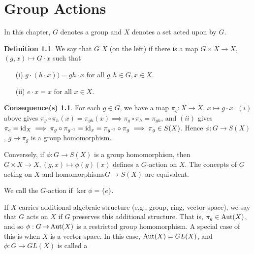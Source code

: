 \documentclass[11pt]{book}
\newcounter{counter}
\theoremstyle{definition}   \newtheorem{defn}[counter]{Definition} %
\newtheorem{consequence}[counter]{Consequence(s)}   \newtheorem*{consequence*}{Consequence(s)}   \newtheorem*{problem*}{Problem}   \newtheorem{notation}[counter]{Notation}
\newcommand{\hm}{homomorphism}   \newcommand{\hms}{homomorphisms}   \newcommand{\iso}{isomorphism}
\DeclareMathOperator{\ra}{\rightarrow}   \DeclareMathOperator{\Poly}{\mathbf{P}}   \DeclareMathOperator{\spn}{\textnormal{span}}   \DeclareMathOperator{\aut}{\textnormal{Aut}}
\newcommand{\vs}{\vspace{8pt}}
\numberwithin{counter}{chapter}
\begin{document}
\chapter{Group Actions}

In this chapter, $G$ denotes a group and $X$ denotes a set acted upon by $G$.
\vs

\begin{defn}
We say that $G$  $X$ (on the left) if there is a map $G \times X \ra X$, $(g,x) \mapsto G\cdot x$ such that
	\begin{enumerate}
	\item[(i)] $g\cdot(h\cdot x)) = gh \cdot x$ for all $g,h \in G, x \in X$.
	\item[(ii)] $e \cdot x = x$ for all $x \in X$.
	\end{enumerate}
\end{defn}

\vs

\begin{consequence}
For each $g\in G$, we have a map $\pi_g : X \ra X$, $x \mapsto g\cdot x$. $(i)$ above gives $\pi_g \circ \pi_h (x) = \pi_{gh}(x) \implies \pi_g \circ \pi_h = \pi_{gh}$, and $(ii)$ gives $\pi_e = \textnormal{id}_X \implies \pi_g \circ \pi_{g\operatorname{^{-1}}} = \textnormal{id}_x = \pi_{g\operatorname{^{-1}}} \circ \pi_{g} \implies \pi_g \in S(X)$. Hence $\phi : G \ra S(X)$, $g \mapsto \pi_g$ is a group homomorphism.

Conversely, if $\phi : G \ra S(X)$ is a group \hm, then $G\times X \ra X, (g,x) \mapsto \phi(g)(x)$ defines a $G$-action on $X$. The concepts of $G$ acting on $X$ and \hms $G\ra S(X)$ are equivalent.

We call the $G$-action  if $\ker \phi = \{e\}$.
\end{consequence}

\vs

\begin{generalization}
If $X$ carries additional algebraic structure (e.g., group, ring, vector space), we say that $G$ acts on $X$ if $G$ preserves this additional structure. That is, $\pi_g \in \aut (X)$, and so $\phi : G \ra \aut(X)$ is a restricted group \hm. A special case of this is when $X$ is a vector space. In this case, $\aut(X) = GL(X)$, and $\phi : G \ra GL(X)$ is called a 
\end{generalization}


\vs
\end{document}
